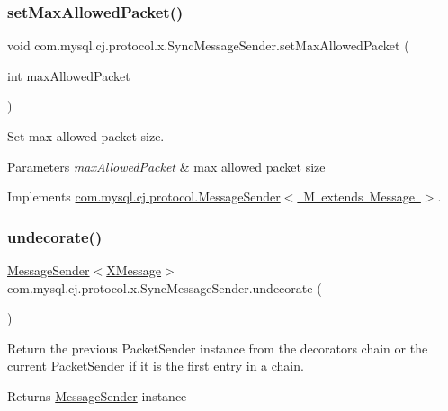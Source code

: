 \subsubsection{\texorpdfstring{set\+Max\+Allowed\+Packet()}{setMaxAllowedPacket()}}
{\footnotesize\ttfamily void com.\+mysql.\+cj.\+protocol.\+x.\+Sync\+Message\+Sender.\+set\+Max\+Allowed\+Packet (\begin{DoxyParamCaption}\item[{int}]{max\+Allowed\+Packet }\end{DoxyParamCaption})}

Set max allowed packet size.


\begin{DoxyParams}{Parameters}
{\em max\+Allowed\+Packet} & max allowed packet size \\
\hline
\end{DoxyParams}


Implements \mbox{\hyperlink{interfacecom_1_1mysql_1_1cj_1_1protocol_1_1_message_sender_a31345b7817dcc7e982bb96dba97b3a01}{com.\+mysql.\+cj.\+protocol.\+Message\+Sender$<$ M extends Message $>$}}.

\mbox{\label{classcom_1_1mysql_1_1cj_1_1protocol_1_1x_1_1_sync_message_sender_aa8fd388e5d4e5e86cb35add7f6e45c7b}} 
\subsubsection{\texorpdfstring{undecorate()}{undecorate()}}
{\footnotesize\ttfamily \mbox{\hyperlink{interfacecom_1_1mysql_1_1cj_1_1protocol_1_1_message_sender}{Message\+Sender}}$<$\mbox{\hyperlink{classcom_1_1mysql_1_1cj_1_1protocol_1_1x_1_1_x_message}{X\+Message}}$>$ com.\+mysql.\+cj.\+protocol.\+x.\+Sync\+Message\+Sender.\+undecorate (\begin{DoxyParamCaption}{ }\end{DoxyParamCaption})}

Return the previous Packet\+Sender instance from the decorators chain or the current Packet\+Sender if it is the first entry in a chain.

\begin{DoxyReturn}{Returns}
\mbox{\hyperlink{interfacecom_1_1mysql_1_1cj_1_1protocol_1_1_message_sender}{Message\+Sender}} instance 
\end{DoxyReturn}


